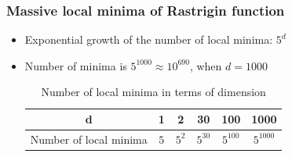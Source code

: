 \documentclass[aspectratio=169]{beamer}
\begin{document}
\begin{frame}
\frametitle{Massive local minima of Rastrigin function}

\begin{itemize}
	\item Exponential growth of the number of local minima: $5^d$
	\item Number of minima is $5^{1000}\approx 10^{690}$, when $d=1000$
	\begin{table}[ht]
		
		\centering\begin{tabular}{|c|c|c|c|c|c|}
			\hline
			d & 1 & 2 & 30 & 100 & 1000 \\
			\hline
			Number of local minima & $5$ & $5^2$ & $5^{30}$ & $5^{100}$ & $5^{1000}$\\
			\hline 
		\end{tabular}
		\caption{Number of local minima in terms of dimension}
	\end{table}
\end{itemize}

\end{frame}
\end{document}
